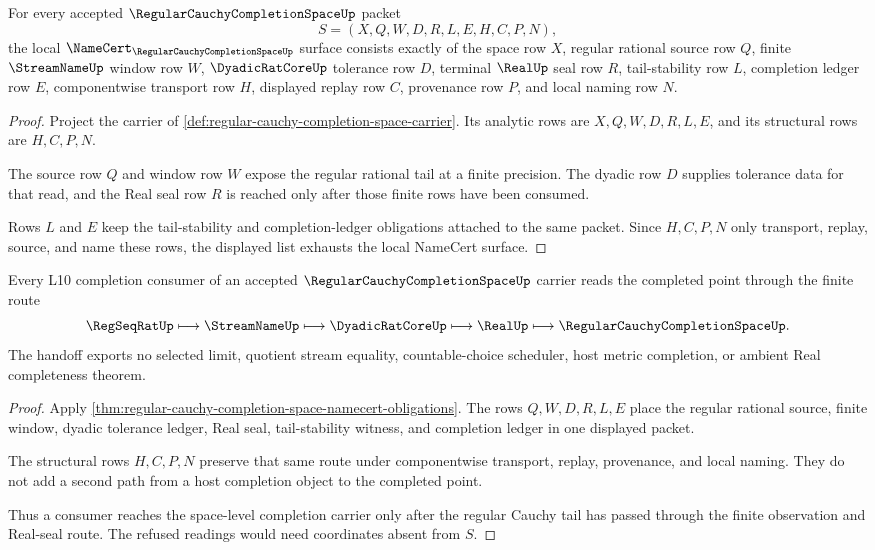 \begin{theorem}
\label{thm:regular-cauchy-completion-space-namecert-obligations}
For every accepted $\RegularCauchyCompletionSpaceUp$ packet
$$
S=(X,Q,W,D,R,L,E,H,C,P,N),
$$
the local $\NameCert_{\RegularCauchyCompletionSpaceUp}$ surface consists exactly of the space row $X$, regular rational source row $Q$, finite $\StreamNameUp$ window row $W$, $\DyadicRatCoreUp$ tolerance row $D$, terminal $\RealUp$ seal row $R$, tail-stability row $L$, completion ledger row $E$, componentwise transport row $H$, displayed replay row $C$, provenance row $P$, and local naming row $N$.
\end{theorem}
\begin{proof}
Project the carrier of \autoref{def:regular-cauchy-completion-space-carrier}. Its analytic rows are $X,Q,W,D,R,L,E$, and its structural rows are $H,C,P,N$.

The source row $Q$ and window row $W$ expose the regular rational tail at a finite precision. The dyadic row $D$ supplies tolerance data for that read, and the Real seal row $R$ is reached only after those finite rows have been consumed.

Rows $L$ and $E$ keep the tail-stability and completion-ledger obligations attached to the same packet. Since $H,C,P,N$ only transport, replay, source, and name these rows, the displayed list exhausts the local NameCert surface.
\end{proof}

\begin{theorem}
\label{thm:regular-cauchy-completion-space-l10-handoff}
Every L10 completion consumer of an accepted $\RegularCauchyCompletionSpaceUp$ carrier reads the completed point through the finite route
$$
\RegSeqRatUp\longmapsto\StreamNameUp\longmapsto\DyadicRatCoreUp\longmapsto\RealUp\longmapsto\RegularCauchyCompletionSpaceUp .
$$
The handoff exports no selected limit, quotient stream equality, countable-choice scheduler, host metric completion, or ambient Real completeness theorem.
\end{theorem}
\begin{proof}
Apply \autoref{thm:regular-cauchy-completion-space-namecert-obligations}. The rows $Q,W,D,R,L,E$ place the regular rational source, finite window, dyadic tolerance ledger, Real seal, tail-stability witness, and completion ledger in one displayed packet.

The structural rows $H,C,P,N$ preserve that same route under componentwise transport, replay, provenance, and local naming. They do not add a second path from a host completion object to the completed point.

Thus a consumer reaches the space-level completion carrier only after the regular Cauchy tail has passed through the finite observation and Real-seal route. The refused readings would need coordinates absent from $S$.
\end{proof}

